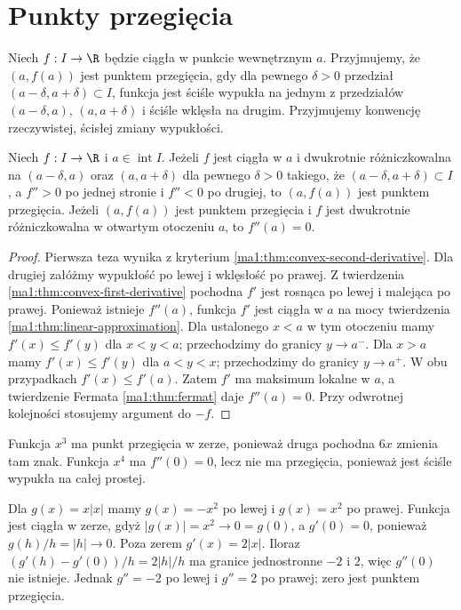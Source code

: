 \section{Punkty przegięcia}
\begin{definicja}
\label{ma1:def:inflection-point}
Niech $f:I\to\R$ będzie ciągła w punkcie wewnętrznym $a$. Przyjmujemy, że $(a,f(a))$ jest punktem przegięcia, gdy dla pewnego $\delta>0$ przedział $(a-\delta,a+\delta)\subset I$, funkcja jest ściśle wypukła na jednym z przedziałów $(a-\delta,a)$, $(a,a+\delta)$ i ściśle wklęsła na drugim. Przyjmujemy konwencję rzeczywistej, ścisłej zmiany wypukłości.
\end{definicja}
\begin{twierdzenie}
\label{ma1:thm:inflection-second-derivative}
Niech $f:I\to\R$ i $a\in\operatorname{int}I$. Jeżeli $f$ jest ciągła w $a$ i dwukrotnie różniczkowalna na $(a-\delta,a)$ oraz $(a,a+\delta)$ dla pewnego $\delta>0$ takiego, że $(a-\delta,a+\delta)\subset I$, a $f''>0$ po jednej stronie i $f''<0$ po drugiej, to $(a,f(a))$ jest punktem przegięcia. Jeżeli $(a,f(a))$ jest punktem przegięcia i $f$ jest dwukrotnie różniczkowalna w otwartym otoczeniu $a$, to $f''(a)=0$.
\end{twierdzenie}
\begin{proof}
Pierwsza teza wynika z kryterium \ref{ma1:thm:convex-second-derivative}. Dla drugiej załóżmy wypukłość po lewej i wklęsłość po prawej. Z twierdzenia \ref{ma1:thm:convex-first-derivative} pochodna $f'$ jest rosnąca po lewej i malejąca po prawej. Ponieważ istnieje $f''(a)$, funkcja $f'$ jest ciągła w $a$ na mocy twierdzenia \ref{ma1:thm:linear-approximation}. Dla ustalonego $x<a$ w tym otoczeniu mamy $f'(x)\le f'(y)$ dla $x<y<a$; przechodzimy do granicy $y\to a^-$. Dla $x>a$ mamy $f'(x)\le f'(y)$ dla $a<y<x$; przechodzimy do granicy $y\to a^+$. W obu przypadkach $f'(x)\le f'(a)$. Zatem $f'$ ma maksimum lokalne w $a$, a twierdzenie Fermata \ref{ma1:thm:fermat} daje $f''(a)=0$. Przy odwrotnej kolejności stosujemy argument do $-f$.
\end{proof}
\begin{przyklad}
\label{ma1:ex:inflection-counterexamples}
Funkcja $x^3$ ma punkt przegięcia w zerze, ponieważ druga pochodna $6x$ zmienia tam znak. Funkcja $x^4$ ma $f''(0)=0$, lecz nie ma przegięcia, ponieważ jest ściśle wypukła na całej prostej.

Dla $g(x)=x|x|$ mamy $g(x)=-x^2$ po lewej i $g(x)=x^2$ po prawej. Funkcja jest ciągła w zerze, gdyż $|g(x)|=x^2\to0=g(0)$, a $g'(0)=0$, ponieważ $g(h)/h=|h|\to0$. Poza zerem $g'(x)=2|x|$. Iloraz $(g'(h)-g'(0))/h=2|h|/h$ ma granice jednostronne $-2$ i $2$, więc $g''(0)$ nie istnieje. Jednak $g''=-2$ po lewej i $g''=2$ po prawej; zero jest punktem przegięcia.
\end{przyklad}
